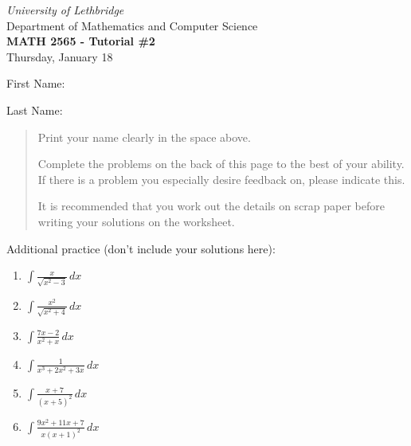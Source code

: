 \documentclass[12pt]{article}
\newcommand{\skipline}{\vspace{12pt}}
\newcommand{\di}{\displaystyle}
\begin{document}
\author{Instructor: Sean Fitzpatrick}
\thispagestyle{empty}
\begin{center}
\emph{University of Lethbridge}\\
Department of Mathematics and Computer Science\\
{\bf MATH 2565 - Tutorial \#2}\\
Thursday, January 18
\end{center}
\skipline \skipline \skipline \noindent \skipline

\skipline
First Name:\underline{\hspace{348pt}}\\
\skipline

\vspace{1cm}

Last Name:\underline{\hspace{351pt}}



\vspace{1cm}

\begin{quote}
Print your name clearly in the space above. 

\medskip

Complete the problems on the back of this page to the best of your ability. If there is a problem you especially desire feedback on, please indicate this. 

\medskip

It is recommended that you work out the details on scrap paper before writing your solutions on the worksheet.
\end{quote}

\vspace{2cm}


Additional practice (don't include your solutions here):
\begin{multicols}{2}
\begin{enumerate}
 \item $\di \int \frac{x}{\sqrt{x^2-3}}\,dx$

 \item $\di \int \frac{x^2}{\sqrt{x^2+4}}\,dx$
 
  \item $\di \int \frac{7x-2}{x^2+x}\,dx$
  
  \item $\di \int \frac{1}{x^3+2x^2+3x}\,dx$  
  
   \item $\di \int \frac{x+7}{(x+5)^2}\,dx$
   
   \item $\di \int \frac{9x^2+11x+7}{x(x+1)^2}\,dx$
\end{enumerate}  
\end{multicols}
\end{document}
